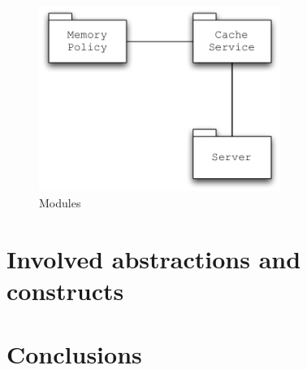 \documentclass[11pt,a4paper]{article}
\begin{document}
\begin{figure}
\begin{center}
\includegraphics[width=0.7\textwidth]{figures/Server-Modules.pdf}
\caption{Modules}
\label{figure:server-modules}
\end{center}
\end{figure}

\section{Involved abstractions and constructs}
\label{section:functionalities}

\section{Conclusions}
\label{section:conclusions}
\end{document}
